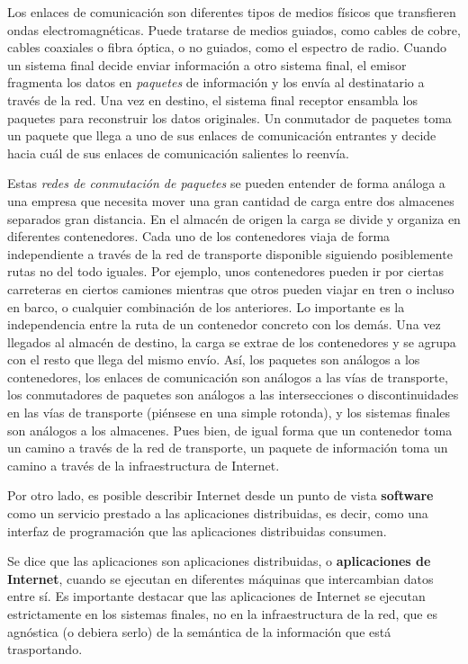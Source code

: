 \documentclass[a4paper]{report}
\begin{document}
    Los enlaces de comunicación son diferentes tipos de medios físicos que transfieren ondas electromagnéticas. Puede tratarse de medios guiados, como cables de cobre, cables coaxiales o fibra óptica, o no guiados, como el espectro de radio. Cuando un sistema final decide enviar información a otro sistema final, el emisor fragmenta los datos en \emph{paquetes} de información y los envía al destinatario a través de la red. Una vez en destino, el sistema final receptor ensambla los paquetes para reconstruir los datos originales. Un conmutador de paquetes toma un paquete que llega a uno de sus enlaces de comunicación entrantes y decide hacia cuál de sus enlaces de comunicación salientes lo reenvía.

    Estas \emph{redes de conmutación de paquetes} se pueden entender de forma análoga a una empresa que necesita mover una gran cantidad de carga entre dos almacenes separados gran distancia. En el almacén de origen la carga se divide y organiza en diferentes contenedores. Cada uno de los contenedores viaja de forma independiente a través de la red de transporte disponible siguiendo posiblemente rutas no del todo iguales. Por ejemplo, unos contenedores pueden ir por ciertas carreteras en ciertos camiones mientras que otros pueden viajar en tren o incluso en barco, o cualquier combinación de los anteriores. Lo importante es la independencia entre la ruta de un contenedor concreto con los demás. Una vez llegados al almacén de destino, la carga se extrae de los contenedores y se agrupa con el resto que llega del mismo envío. Así, los paquetes son análogos a los contenedores, los enlaces de comunicación son análogos a las vías de transporte, los conmutadores de paquetes son análogos a las intersecciones o discontinuidades en las vías de transporte (piénsese en una simple rotonda), y los sistemas finales son análogos a los almacenes. Pues bien, de igual forma que un contenedor toma un camino a través de la red de transporte, un paquete de información toma un camino a través de la infraestructura de Internet.

    Por otro lado, es posible describir Internet desde un punto de vista \textbf{software} como un servicio prestado a las aplicaciones distribuidas, es decir, como una interfaz de programación que las aplicaciones distribuidas consumen.
    
    Se dice que las aplicaciones son aplicaciones distribuidas, o \textbf{aplicaciones de Internet}, cuando se ejecutan en diferentes máquinas que intercambian datos entre sí. Es importante destacar que las aplicaciones de Internet se ejecutan estrictamente en los sistemas finales, no en la infraestructura de la red, que es agnóstica (o debiera serlo) de la semántica de la información que está trasportando.
    
\end{document}
